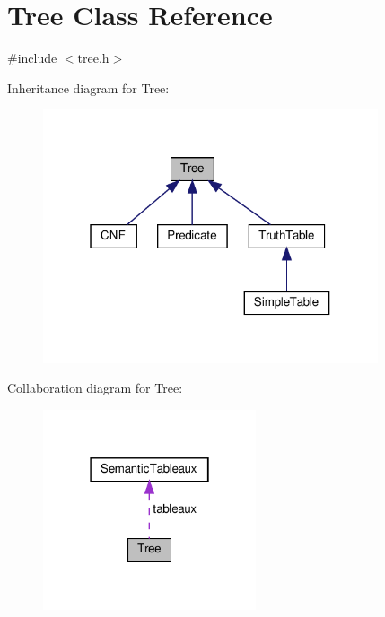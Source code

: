 \hypertarget{class_tree}{}\section{Tree Class Reference}
\label{class_tree}


{\ttfamily \#include $<$tree.\+h$>$}



Inheritance diagram for Tree\+:\nopagebreak
\begin{figure}[H]
\begin{center}
\leavevmode
\includegraphics[width=280pt]{d2/d0b/class_tree__inherit__graph}
\end{center}
\end{figure}


Collaboration diagram for Tree\+:\nopagebreak
\begin{figure}[H]
\begin{center}
\leavevmode
\includegraphics[width=178pt]{de/dda/class_tree__coll__graph}
\end{center}
\end{figure}
